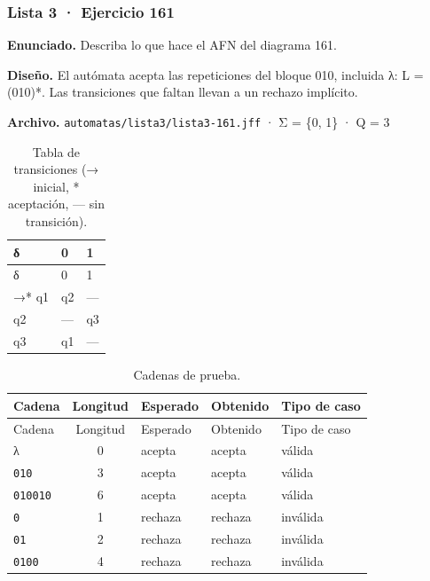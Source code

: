 
\hypertarget{lista-3-ejercicio-161}{%
\subsubsection{Lista 3 · Ejercicio 161}\label{lista-3-ejercicio-161}}

\textbf{Enunciado.} Describa lo que hace el AFN del diagrama 161.

\textbf{Diseño.} El autómata acepta las repeticiones del bloque 010, incluida λ: L = (010)*. Las transiciones que faltan llevan a un rechazo implícito.

\textbf{Archivo.} \texttt{automatas/lista3/lista3-161.jff} · Σ = \{0, 1\} · \textbar Q\textbar{} = 3

\begin{longtable}[]{@{}lll@{}}
\caption{Tabla de transiciones (→ inicial, * aceptación, --- sin transición).}\tabularnewline
\toprule\noalign{}
δ & 0 & 1 \\
\midrule\noalign{}
\endfirsthead
\toprule\noalign{}
δ & 0 & 1 \\
\midrule\noalign{}
\endhead
\bottomrule\noalign{}
\endlastfoot
→* q1 & q2 & --- \\
q2 & --- & q3 \\
q3 & q1 & --- \\
\end{longtable}

\begin{longtable}[]{@{}lclll@{}}
\caption{Cadenas de prueba.}\tabularnewline
\toprule\noalign{}
Cadena & Longitud & Esperado & Obtenido & Tipo de caso \\
\midrule\noalign{}
\endfirsthead
\toprule\noalign{}
Cadena & Longitud & Esperado & Obtenido & Tipo de caso \\
\midrule\noalign{}
\endhead
\bottomrule\noalign{}
\endlastfoot
λ & 0 & acepta & acepta & válida \\
\texttt{010} & 3 & acepta & acepta & válida \\
\texttt{010010} & 6 & acepta & acepta & válida \\
\texttt{0} & 1 & rechaza & rechaza & inválida \\
\texttt{01} & 2 & rechaza & rechaza & inválida \\
\texttt{0100} & 4 & rechaza & rechaza & inválida \\
\end{longtable}

